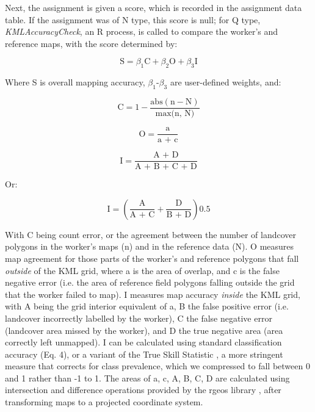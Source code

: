 \documentclass[preprint,12pt,authoryear]{elsarticle}
\begin{document}
Next, the assignment is given a score, which is recorded in the assignment data table. If the assignment was of N type, this score is null;  for Q type, \emph{KMLAccuracyCheck}, an R process, is called to compare the worker's and reference maps, with the score determined by:

\begin{equation}
  \textrm{S} = \beta_1\textrm{C} + \beta_2\textrm{O} + \beta_3\textrm{I}
\end{equation}

\noindent Where S is overall mapping accuracy, $\beta_1$-$\beta_3$ are user-defined weights, and: 

\begin{equation}
  \textrm{C} = 1 - \frac{\textrm{abs}(\textrm{n} - \textrm{N})}{\textrm{max(n, N)}}
\end{equation}
 
\begin{equation}
  \textrm{O} = \frac{\textrm{a}}{\textrm{a + c}}
\end{equation}

\begin{equation}
 \textrm{I} = \frac{\textrm{A + D}}{\textrm{A + B + C + D}}
\end{equation}

Or: 

\begin{equation}
  \textrm{I} = \left(\frac{\textrm{A}}{\textrm{A + C}} + \frac{\textrm{D}}{\textrm{B + D}}\right)0.5
\end{equation}

\noindent With C being count error, or the agreement between the number of landcover polygons in the worker's maps (n) and in the reference data (N). O measures map agreement for those parts of the worker's and reference polygons that fall \emph{outside} of the KML grid, where a is the area of overlap, and c is the false negative error (i.e. the area of reference field polygons falling outside the grid that the worker failed to map). I measures map accuracy \emph{inside} the KML grid, with A being the grid interior equivalent of a, B the false positive error (i.e. landcover incorrectly labelled by the worker), C the false negative error (landcover area missed by the worker), and D the true negative area (area correctly left unmapped). I can be calculated using standard classification accuracy (Eq. 4), or a variant of the True Skill Statistic \citep[Eq. 5][]{allouche_assessing_2006}, a more stringent measure that corrects for class prevalence, which we compressed to fall between 0 and 1 rather than -1 to 1. The areas of a, c, A, B, C, D are calculated using intersection and difference operations provided by the rgeos library \citep{bivand_rgeos:_2013}, after transforming maps to a projected coordinate system.  
\end{document}
